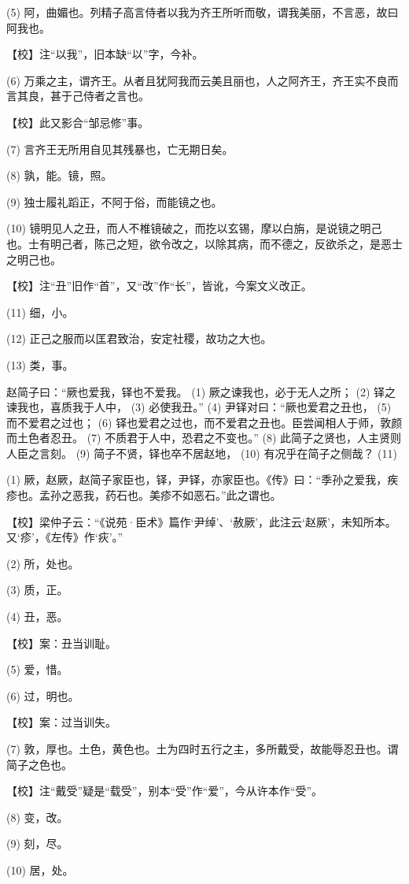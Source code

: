\documentclass[12pt,UTF8]{ctexbook}
\begin{document}
(5) 阿，曲媚也。列精子高言侍者以我为齐王所听而敬，谓我美丽，不言恶，故曰阿我也。

【校】注“以我”，旧本缺“以”字，今补。

(6) 万乘之主，谓齐王。从者且犹阿我而云美且丽也，人之阿齐王，齐王实不良而言其良，甚于己侍者之言也。

【校】此又影合“邹忌修”事。

(7) 言齐王无所用自见其残暴也，亡无期日矣。

(8) 孰，能。镜，照。

(9) 独士履礼蹈正，不阿于俗，而能镜之也。

(10) 镜明见人之丑，而人不椎镜破之，而扢以玄锡，摩以白旃，是说镜之明己也。士有明己者，陈己之短，欲令改之，以除其病，而不德之，反欲杀之，是恶士之明己也。

【校】注“丑”旧作“首”，又“改”作“长”，皆讹，今案文义改正。

(11) 细，小。

(12) 正己之服而以匡君致治，安定社稷，故功之大也。

(13) 类，事。

赵简子曰：“厥也爱我，铎也不爱我。 (1) 厥之谏我也，必于无人之所； (2) 铎之谏我也，喜质我于人中， (3) 必使我丑。” (4) 尹铎对曰：“厥也爱君之丑也， (5) 而不爱君之过也； (6) 铎也爱君之过也，而不爱君之丑也。臣尝闻相人于师，敦颜而土色者忍丑。 (7) 不质君于人中，恐君之不变也。” (8) 此简子之贤也，人主贤则人臣之言刻。 (9) 简子不贤，铎也卒不居赵地， (10) 有况乎在简子之侧哉？ (11)

(1) 厥，赵厥，赵简子家臣也，铎，尹铎，亦家臣也。《传》曰：“季孙之爱我，疾疹也。孟孙之恶我，药石也。美疹不如恶石。”此之谓也。

【校】梁仲子云：“《说苑·臣术》篇作‘尹绰’、‘赦厥’，此注云‘赵厥’，未知所本。又‘疹’，《左传》作‘疢’。”

(2) 所，处也。

(3) 质，正。

(4) 丑，恶。

【校】案：丑当训耻。

(5) 爱，惜。

(6) 过，明也。

【校】案：过当训失。

(7) 敦，厚也。土色，黄色也。土为四时五行之主，多所戴受，故能辱忍丑也。谓简子之色也。

【校】注“戴受”疑是“载受”，别本“受”作“爱”，今从许本作“受”。

(8) 变，改。

(9) 刻，尽。

(10) 居，处。
\end{document}
